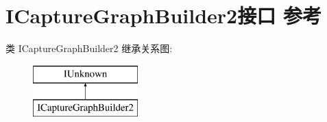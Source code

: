 \hypertarget{interface_i_capture_graph_builder2}{}\section{I\+Capture\+Graph\+Builder2接口 参考}
\label{interface_i_capture_graph_builder2}
类 I\+Capture\+Graph\+Builder2 继承关系图\+:\begin{figure}[H]
\begin{center}
\leavevmode
\includegraphics[height=2.000000cm]{interface_i_capture_graph_builder2}
\end{center}
\end{figure}
